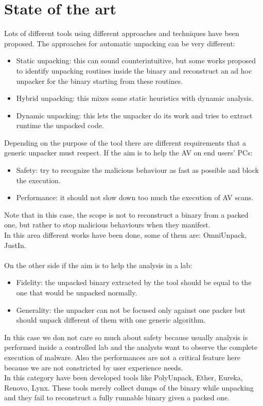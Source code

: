 \section{State of the art}
Lots of different tools using different approaches and techniques have been proposed. 
The approaches for automatic unpacking can be very different:
\begin{itemize}
\item Static unpacking: this can sound counterintuitive, but some works proposed to identify unpacking routines inside the binary and reconstruct an ad hoc unpacker for the binary starting from these routines.
\item Hybrid unpacking: this mixes some static heuristics with dynamic analysis.
\item Dynamic unpacking: this lets the unpacker do its work and tries to extract runtime the unpacked code. 
\end{itemize}
\vspace{\baselineskip}
Depending on the purpose of the tool there are different requirements that a generic unpacker must respect. If the aim is to help the AV on end users' PCs:
\begin{itemize}
\item Safety: try to recognize the malicious behaviour as fast as possible and block the execution. 
\item Performance: it should not slow down too much the execution of AV scans.
\end{itemize}
Note that in this case, the scope is not to reconstruct a binary from a packed one, but rather to stop malicious behaviours when they manifest. \\
In this area different works have been done, some of them are: OmniUnpack, JustIn.\\
\medskip \\
On the other side if the aim is to help the analysis in a lab:
\begin{itemize}
\item Fidelity: the unpacked binary extracted by the tool should be equal to the one that would be unpacked normally. 
\item Generality: the unpacker can not be focused only against one packer but should unpack different of them with one generic algorithm.
\end{itemize}
In this case we don not care so much about safety because usually analysis is performed inside a controlled lab and the analysts want to observe the complete execution of malware. Also the performances are not a critical feature here because we are not constricted by user experience needs.\\
In this category have been developed tools like PolyUnpack, Ether, Eureka, Renovo, Lynx.
These tools merely collect dumps of the binary while unpacking and they fail to reconstruct a fully runnable binary given a packed one.


